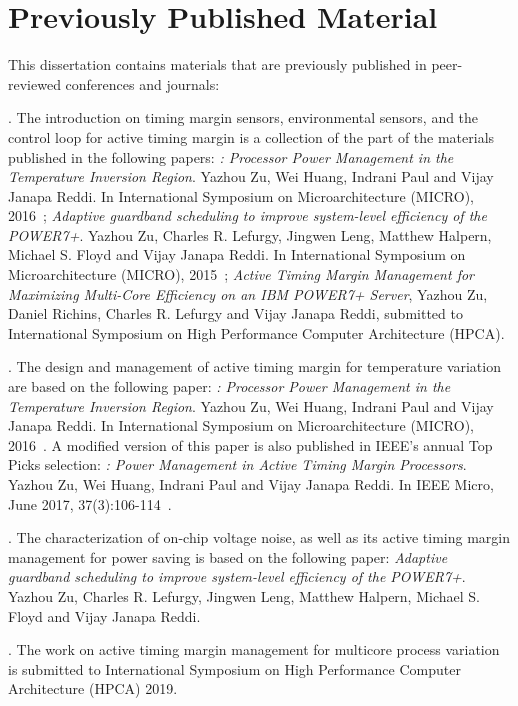 \section{Previously Published Material}
\label{sec:intro:prev}

This dissertation contains materials that are previously published in peer-reviewed conferences and journals:

\textbf{}. The introduction on timing margin sensors, environmental sensors, and the control loop for active timing margin is a collection of the part of the materials published in the following papers: \textit{\tistates: Processor Power Management in the Temperature Inversion Region}. Yazhou Zu, Wei Huang, Indrani Paul and Vijay Janapa Reddi. In International Symposium on Microarchitecture (MICRO), 2016~\cite{zu2016tistate}; \textit{Adaptive guardband scheduling to improve system-level efficiency of the POWER7+}. Yazhou Zu, Charles R. Lefurgy, Jingwen Leng, Matthew Halpern, Michael S. Floyd and Vijay Janapa Reddi. In International Symposium on Microarchitecture (MICRO), 2015~\cite{zu2015adaptive}; \textit{Active Timing Margin Management for Maximizing Multi-Core Efficiency on an IBM POWER7+ Server}, Yazhou Zu, Daniel Richins, Charles R. Lefurgy and Vijay Janapa Reddi, submitted to International Symposium on High Performance Computer Architecture (HPCA).

\textbf{}. The design and management of active timing margin for temperature variation are based on the following paper: \textit{\tistates: Processor Power Management in the Temperature Inversion Region}. Yazhou Zu, Wei Huang, Indrani Paul and Vijay Janapa Reddi. In International Symposium on Microarchitecture (MICRO), 2016~\cite{zu2016tistate}. A modified version of this paper is also published in IEEE's annual Top Picks selection: \textit{\tistates: Power Management in Active Timing Margin Processors}. Yazhou Zu, Wei Huang, Indrani Paul and Vijay Janapa Reddi. In IEEE Micro, June 2017, 37(3):106-114~\cite{zu2017ti}.

\textbf{}. The characterization of on-chip voltage noise, as well as its active timing margin management for power saving is based on the following paper: \textit{Adaptive guardband scheduling to improve system-level efficiency of the POWER7+}. Yazhou Zu, Charles R. Lefurgy, Jingwen Leng, Matthew Halpern, Michael S. Floyd and Vijay Janapa Reddi. 

\textbf{}. The work on active timing margin management for multicore process variation is submitted to International Symposium on High Performance Computer Architecture (HPCA) 2019.

